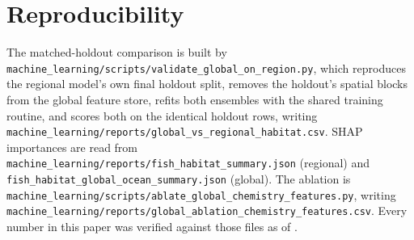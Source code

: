 \documentclass[runningheads]{llncs}
\begin{document}


\section*{Reproducibility}
The matched-holdout comparison is built by
\texttt{machine\_learning/scripts/validate\_global\_on\_region.py}, which
reproduces the regional model's own final holdout split, removes the holdout's
spatial blocks from the global feature store, refits both ensembles with the
shared training routine, and scores both on the identical holdout rows,
writing \texttt{machine\_learning/reports/global\_vs\_regional\_habitat.csv}.
SHAP importances are read from
\texttt{machine\_learning/reports/fish\_habitat\_summary.json} (regional) and
\texttt{fish\_habitat\_global\_ocean\_summary.json} (global). The ablation is
\texttt{machine\_learning/scripts/ablate\_global\_chemistry\_features.py}, writing
\texttt{machine\_learning/reports/global\_ablation\_chemistry\_features.csv}.
Every number in this paper was verified against those files as of \AsOf{}.



\end{document}
